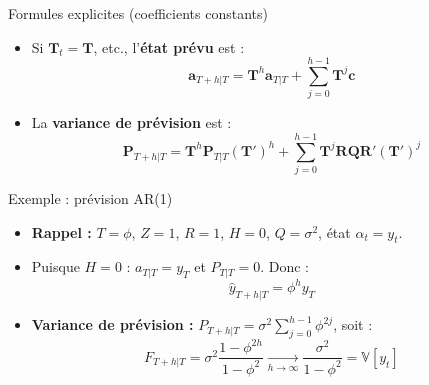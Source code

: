 \documentclass[11pt,aspectratio=169]{beamer}
\newcommand{\Var}{\mathbb{V}}
\begin{document}
\begin{frame}{Formules explicites (coefficients constants)}

\begin{itemize}

\item Si $\bm{T}_t = \bm{T}$, etc., l'\textbf{état prévu} est :
  \[
  \bm{a}_{T+h|T} = \bm{T}^h \bm{a}_{T|T} + \sum_{j=0}^{h-1} \bm{T}^j \bm{c}
  \]\newline

\item La \textbf{variance de prévision} est :
  \[
  \bm{P}_{T+h|T} = \bm{T}^h \bm{P}_{T|T} (\bm{T}')^h + \sum_{j=0}^{h-1} \bm{T}^j \bm{R} \bm{Q} \bm{R}' (\bm{T}')^j
  \]

\end{itemize}

\end{frame}

\begin{frame}{Exemple : prévision AR(1)}

\begin{itemize}

\item \textbf{Rappel :} $T = \phi$, $Z = 1$, $R = 1$, $H = 0$, $Q = \sigma^2$, état $\alpha_t = y_t$.\newline

\item Puisque $H = 0$ : $a_{T|T} = y_T$ et $P_{T|T} = 0$. Donc :
  \[
  \hat{y}_{T+h|T} = \phi^h y_T
  \]\newline

\item \textbf{Variance de prévision :} $P_{T+h|T} = \sigma^2 \sum_{j=0}^{h-1} \phi^{2j}$, soit :
  \[
  F_{T+h|T} = \sigma^2 \frac{1 - \phi^{2h}}{1 - \phi^2} \xrightarrow[h\to\infty]{} \frac{\sigma^2}{1 - \phi^2} = \Var[y_t]
  \]

\end{itemize}

\end{frame}
\end{document}

